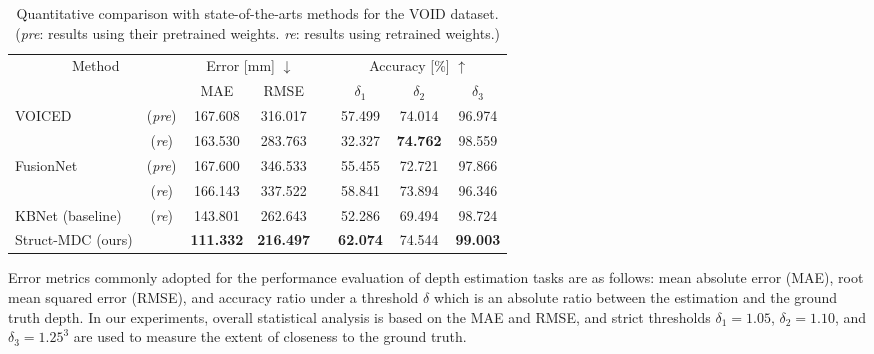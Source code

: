 \begin{table}[t]
\centering
\renewcommand{\arraystretch}{1.10} \renewcommand{\tabcolsep}{0.8mm}  \caption{Quantitative comparison with state-of-the-arts \textcolor{color1}{methods} for the VOID \textcolor{color1}{dataset}. 
(\textit{pre}: results using their pretrained weights. 
\textit{re}: results using retrained weights.)
}

\begin{tabular}{lccccccc}
\hline
\multicolumn{2}{c}{\multirow{2}{*}{Method}} & \multicolumn{2}{c}{Error {[}mm{]} $\downarrow$} &  & \multicolumn{3}{c}{Accuracy {[}\%{]} $\uparrow$}    \\ \cline{3-4} \cline{6-8} 
\multicolumn{2}{c}{}                        & MAE                    & RMSE                   &  & $\delta_1$      & $\delta_2$      & $\delta_3$      \\ \hline
\multirow{2}{*}{\textcolor{color2}{VOICED~\cite{void}}}             & (\textit{pre}) & 167.608                & 316.017                &  & 57.499          & 74.014          & 96.974          \\
                                    & (\textit{re})  & 163.530                & 283.763                &  & 32.327          & \textbf{74.762} & 98.559          \\
\multirow{2}{*}{\textcolor{color2}{FusionNet~\cite{learning_top}}} & (\textit{pre}) & 167.600                & 346.533                &  & 55.455          & 72.721          & 97.866          \\
                                    & (\textit{re})  & 166.143                & 337.522                &  & 58.841          & 73.894          & 96.346          \\
\textcolor{color2}{KBNet (baseline)~\cite{baseline}}                    & (\textit{re})  & 143.801                & 262.643                &  & 52.286          & 69.494          & 98.724          \\
Struct-MDC (ours)                                &       & \textbf{111.332}       & \textbf{216.497}       &  & \textbf{62.074} & 74.544          & \textbf{99.003} \\ \hline
\end{tabular}
\label{table:exp_void}
\end{table}


Error metrics commonly \textcolor{color1}{adopted} for \textcolor{color1}{the} performance evaluation of depth estimation tasks \cite{baseline, error_metric3} are as follows: mean absolute error (MAE), root mean squared error (RMSE), and accuracy ratio under a threshold $\delta$ which is an absolute ratio between the estimation and the ground truth depth. 
In our experiments, overall statistic\textcolor{color1}{al analysis is based on} the MAE and RMSE, and strict thresholds $\delta_1 = 1.05$, $\delta_2 = 1.10$\textcolor{color1}{, and} $\delta_3 = 1.25^3$ are used to measure the extent of close\textcolor{color1}{ness} to the ground truth.

